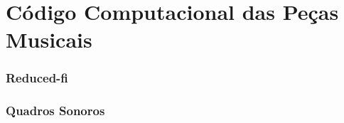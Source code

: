 \chapter{Código Computacional das Peças Musicais}
\label{cap:codigoPecas}

\subsection{Reduced-fi}

\subsection{Quadros Sonoros}

